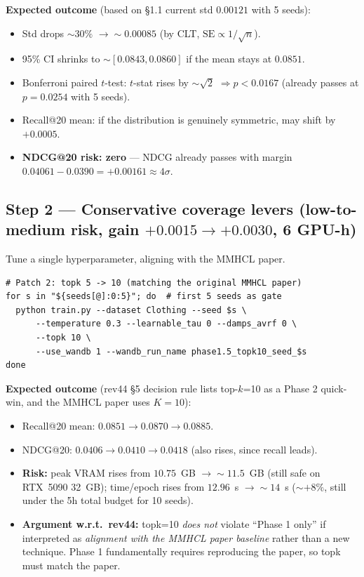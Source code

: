 \documentclass[11pt,a4paper]{article}
\begin{document}
\textbf{Expected outcome} (based on \S1.1 current std $0.00121$ with 5 seeds):
\begin{itemize}[leftmargin=*]
    \item Std drops $\sim 30\%$ $\to \sim 0.00085$ (by CLT, $\text{SE} \propto 1/\sqrt{n}$).
    \item 95\% CI shrinks to $\sim [0.0843, 0.0860]$ if the mean stays at $0.0851$.
    \item Bonferroni paired $t$-test: $t$-stat rises by $\sim \sqrt{2}$ $\Rightarrow p < 0.0167$ (already passes at $p=0.0254$ with 5 seeds).
    \item Recall@20 mean: if the distribution is genuinely symmetric, may shift by $+0.0005$.
    \item \textbf{NDCG@20 risk: zero} --- NDCG already passes with margin $0.04061 - 0.0390 = +0.00161 \approx 4\sigma$.
\end{itemize}

\subsection*{Step 2 --- Conservative coverage levers (low-to-medium risk, gain $+0.0015 \to +0.0030$, 6 GPU-h)}

Tune a single hyperparameter, aligning with the MMHCL paper.

\begin{lstlisting}[style=bashstyle]
# Patch 2: topk 5 -> 10 (matching the original MMHCL paper)
for s in "${seeds[@]:0:5}"; do  # first 5 seeds as gate
  python train.py --dataset Clothing --seed $s \
      --temperature 0.3 --learnable_tau 0 --damps_avrf 0 \
      --topk 10 \
      --use_wandb 1 --wandb_run_name phase1.5_topk10_seed_$s
done
\end{lstlisting}

\textbf{Expected outcome} (rev44 \S5 decision rule lists top-$k$=10 as a
Phase 2 quick-win, and the MMHCL paper uses $K=10$):
\begin{itemize}[leftmargin=*]
    \item Recall@20 mean: $0.0851 \to 0.0870 \to 0.0885$.
    \item NDCG@20: $0.0406 \to 0.0410 \to 0.0418$ (also rises, since recall leads).
    \item \textbf{Risk:} peak VRAM rises from $10.75$~GB $\to \sim 11.5$~GB (still safe on RTX~5090 32~GB); time/epoch rises from $12.96$~s $\to \sim 14$~s ($\sim +8\%$, still under the 5h total budget for 10 seeds).
    \item \textbf{Argument w.r.t.\ rev44:} topk=10 \emph{does not} violate ``Phase 1 only'' if interpreted as \emph{alignment with the MMHCL paper baseline} rather than a new technique. Phase 1 fundamentally requires reproducing the paper, so topk must match the paper.
\end{itemize}
\end{document}
